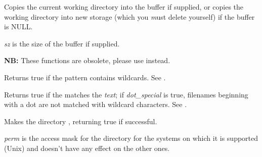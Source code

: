 Copies the current working directory into the buffer if supplied, or
copies the working directory into new storage (which you {\emph must} delete
yourself) if the buffer is NULL.

{\it sz} is the size of the buffer if supplied.


\label{wxgettempfilename}




{\bf NB:} These functions are obsolete, please use\rtfsp
{}\rtfsp
instead.


\label{wxiswild}


Returns true if the pattern contains wildcards. See .


\label{wxmatchwild}


Returns true if the \/ matches the {\it text}\/; if {\it
dot\_special}\/ is true, filenames beginning with a dot are not matched
with wildcard characters. See .


\label{wxmkdir}


Makes the directory , returning true if successful.

{\it perm} is the access mask for the directory for the systems on which it is
supported (Unix) and doesn't have any effect on the other ones.



